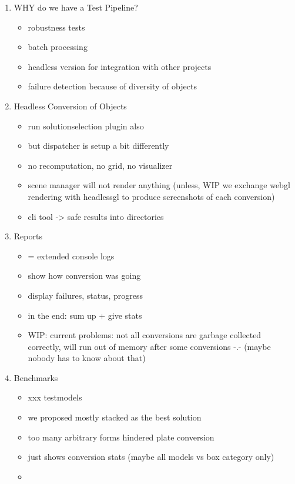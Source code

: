 \documentclass[../ClassicThesis.tex]{subfiles}
\begin{document}
\begin{enumerate}
\item WHY do we have a Test Pipeline?
  \begin{itemize}
  \item robustness tests
  \item batch processing
  \item headless version for integration with other projects
  \item failure detection because of diversity of objects
  \end{itemize}

\item Headless Conversion of Objects
  \begin{itemize}
  \item run solutionselection plugin also
  \item but dispatcher is setup a bit differently
  \item no recomputation, no grid, no visualizer
  \item scene manager will not render anything (unless, WIP we exchange webgl
    rendering with headlessgl to produce screenshots of each conversion)
  \item cli tool -> safe results into directories
  \end{itemize}

\item Reports
  \begin{itemize}
  \item = extended console logs
  \item show how conversion was going
  \item display failures, status, progress
  \item in the end: sum up + give stats
  \item WIP: current problems: not all conversions are garbage collected
    correctly, will run out of memory after some conversions -.- (maybe nobody
    has to know about that)
  \end{itemize}

\item Benchmarks
  \begin{itemize}
  \item xxx testmodels
  \item we proposed mostly stacked as the best solution
  \item too many arbitrary forms hindered plate conversion
  \item just shows conversion stats (maybe all models vs box category only)
  \item {}
  \end{itemize}
\end{enumerate}


\fi
\end{document}
